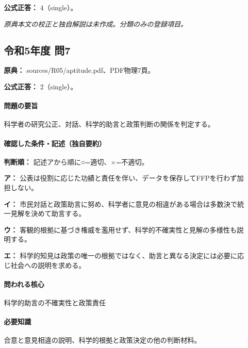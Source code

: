 \textbf{公式正答：} 4（single）。

\par\textit{原典本文の校正と独自解説は未作成。分類のみの登録項目。}

\subsection{令和5年度 問7}
\label{q:r05-reg-apt-07}

\noindent\textbf{原典：} sources/R05/aptitude.pdf、PDF物理7頁。

\textbf{公式正答：} 2（single）。

\paragraph{問題の要旨} 科学者の研究公正、対話、科学的助言と政策判断の関係を判定する。

\paragraph{確認した条件・記述（独自要約）}\mbox{}\par

\noindent\textbf{判断順：} 記述アから順に○=適切、×=不適切。\par

\noindent\textbf{ア：} 公表は役割に応じた功績と責任を伴い、データを保存してFFPを行わず加担しない。\par

\noindent\textbf{イ：} 市民対話と政策助言に努め、科学者に意見の相違がある場合は多数決で統一見解を決めて助言する。\par

\noindent\textbf{ウ：} 客観的根拠に基づき権威を濫用せず、科学的不確実性と見解の多様性も説明する。\par

\noindent\textbf{エ：} 科学的知見は政策の唯一の根拠ではなく、助言と異なる決定には必要に応じ社会への説明を求める。\par

\paragraph{問われる核心} 科学的助言の不確実性と政策責任

\paragraph{必要知識} 合意と意見相違の説明、科学的根拠と政策決定の他の判断材料。

